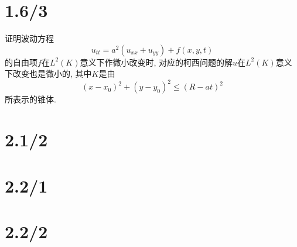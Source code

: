 \documentclass[11pt,a4paper]{article}
\author{刘逸灏 (515370910207)}
\begin{document}
\maketitle

\section{1.6/3}
\begin{problem}
证明波动方程
$$u_{tt}=a^2(u_{xx}+u_{yy})+f(x,y,t)$$
的自由项$f$在$L^2(K)$意义下作微小改变时, 对应的柯西问题的解$u$在$L^2(K)$意义下改变也是微小的, 其中$K$是由
$$(x-x_0)^2+(y-y_0)^2\leqslant(R-at)^2$$
所表示的锥体.
\end{problem}

\section{2.1/2}

\section{2.2/1}

\section{2.2/2}
\end{document}
